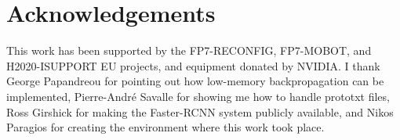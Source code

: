 \documentclass[10pt,twocolumn,letterpaper]{article}
\begin{document}

\section{Acknowledgements}
This work has been supported by the FP7-RECONFIG, FP7-MOBOT, and H2020-ISUPPORT EU projects, and equipment donated by NVIDIA. 
I thank George Papandreou for pointing out how  low-memory backpropagation can be implemented,  Pierre-Andr\'e Savalle for showing me how to handle prototxt files, Ross Girshick for making the Faster-RCNN system  publicly available, and Nikos Paragios for creating the environment where this work took place.
\end{document}

